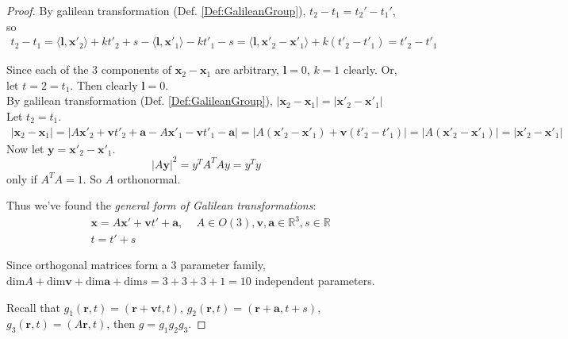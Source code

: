 \documentclass[10pt]{amsart}
\begin{document}
\begin{multicols*}{2}
\begin{proof}
By galilean transformation (Def. \ref{Def:GalileanGroup}), $t_2 - t_1 = t_2' - t_1'$, so 
\[
\begin{gathered}
t_2 - t_1 = \langle \mathbf{l} , \mathbf{x}'_2 \rangle + k t'_2 + s - \langle \mathbf{l}, \mathbf{x}'_1 \rangle - k t'_1 - s = \langle \mathbf{l}, \mathbf{x}'_2 - \mathbf{x}'_1 \rangle + k (t'_2 - t'_1) = t'_2 - t'_1
\end{gathered}\]
	
Since each of the 3 components of $\mathbf{x}_2 - \mathbf{x}_1$ are arbitrary, $\mathbf{l} = 0$, $k=1$ clearly. Or, let $t=2 = t_1$. Then clearly $\mathbf{l}=0$. \\

By galilean transformation (Def. \ref{Def:GalileanGroup}), $|\mathbf{x}_2 - \mathbf{x}_1 | = |\mathbf{x}'_2 - \mathbf{x}'_1 |$ \\

Let $t_2 = t_1$. \\
\[
\begin{gathered}
|\mathbf{x}_2 - \mathbf{x}_1 | = |A\mathbf{x}'_2 + \mathbf{v} t'_2 + \mathbf{a} - A \mathbf{x}'_1  - \mathbf{v}t'_1 - \mathbf{a}| = | A (\mathbf{x}'_2 - \mathbf{x}'_1 ) + \mathbf{v} (t'_2 - t'_1) | = | A(\mathbf{x}'_2 - \mathbf{x}'_1)| = | \mathbf{x}'_2 - \mathbf{x}'_1 |
\end{gathered}\]
Now let $\mathbf{y} = \mathbf{x}'_2 - \mathbf{x}'_1$.
\[
|A\mathbf{y} |^2 = y^T A^T A y = y^T y 
\]
only if $A^T A = 1$. So $A$ orthonormal.

Thus we've found the \emph{general form of Galilean transformations}:
\begin{equation}\label{Eq:GeneralFormOfGalileanTransformations}
\boxed{ \begin{aligned} & \mathbf{x} = A \mathbf{x}' + \mathbf{v} t' + \mathbf{a}, \quad \, A\in O(3), \mathbf{v},\mathbf{a} \in \mathbb{R}^3, s\in\mathbb{R} \\
& t= t'+s \end{aligned} }
\end{equation}

Since orthogonal matrices form a 3 parameter family, $\text{dim}A + \text{dim}\mathbf{v} + \text{dim}\mathbf{a} + \text{dim}s = 3+ 3+3 + 1 = 10$ independent parameters.

Recall that $g_1(\mathbf{r}, t) = (\mathbf{r} + \mathbf{v} t, t)$, $g_2 (\mathbf{r}, t) = (\mathbf{r} + \mathbf{a}, t+s)$, $g_3 (\mathbf{r}, t) = (A\mathbf{r}, t)$, then $g= g_1g_2g_3$.

\end{proof}


\end{multicols*}
\end{document}
